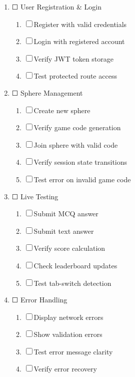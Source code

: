 \documentclass[12pt,a4paper]{report}
\begin{document}
\begin{enumerate}[left=0pt]
  \item {\large ☐ User Registration \& Login}
  \begin{enumerate}[left=1cm]
    \item ☐ Register with valid credentials
    \item ☐ Login with registered account
    \item ☐ Verify JWT token storage
    \item ☐ Test protected route access
  \end{enumerate}
  
  \item {\large ☐ Sphere Management}
  \begin{enumerate}[left=1cm]
    \item ☐ Create new sphere
    \item ☐ Verify game code generation
    \item ☐ Join sphere with valid code
    \item ☐ Verify session state transitions
    \item ☐ Test error on invalid game code
  \end{enumerate}
  
  \item {\large ☐ Live Testing}
  \begin{enumerate}[left=1cm]
    \item ☐ Submit MCQ answer
    \item ☐ Submit text answer
    \item ☐ Verify score calculation
    \item ☐ Check leaderboard updates
    \item ☐ Test tab-switch detection
  \end{enumerate}
  
  \item {\large ☐ Error Handling}
  \begin{enumerate}[left=1cm]
    \item ☐ Display network errors
    \item ☐ Show validation errors
    \item ☐ Test error message clarity
    \item ☐ Verify error recovery
  \end{enumerate}
\end{enumerate}
\end{document}
